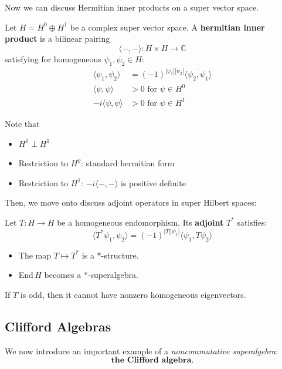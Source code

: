 Now we can discuss Hermitian inner products on a super vector space. 

\begin{definition}
Let $H = H^0 \oplus H^1$ be a complex super vector space. A \textbf{hermitian inner product} is a bilinear pairing
\[
    \langle -,- \rangle : H \times H \to \mathbb{C}
\]
satisfying for homogeneous $\psi_1, \psi_2 \in H$:
\begin{align*}
    \langle \psi_1, \psi_2 \rangle &= (-1)^{|\psi_1||\psi_2|} \overline{\langle \psi_2, \psi_1 \rangle} \\
    \langle \psi, \psi \rangle &> 0 \text{ for } \psi \in H^0 \\
    -i \langle \psi, \psi \rangle &> 0 \text{ for } \psi \in H^1
\end{align*}
\end{definition}
Note that
\begin{itemize}
    \item $H^0 \perp H^1$
    \item Restriction to $H^0$: standard hermitian form
    \item Restriction to $H^1$: $-i\langle -,- \rangle$ is positive definite
\end{itemize}

Then, we move onto discuss adjoint operators in super Hilbert spaces:

\begin{definition}
Let $T : H \to H$ be a homogeneous endomorphism. Its \textbf{adjoint} $T^*$ satisfies:
\[
    \langle T^* \psi_1, \psi_2 \rangle = (-1)^{|T||\psi_1|} \langle \psi_1, T \psi_2 \rangle
\]
\end{definition}
\begin{itemize}
    \item The map $T \mapsto T^*$ is a $*$-structure.
    \item End$\,H$ becomes a $*$-superalgebra.
\end{itemize}

\begin{remark}
    If $T$ is odd, then it cannot have nonzero homogeneous eigenvectors.
\end{remark}

\subsection{Clifford Algebras}
We now introduce an important example of a \emph{noncommutative superalgebra}:
    \[
    \textbf{the Clifford algebra.}
    \]

